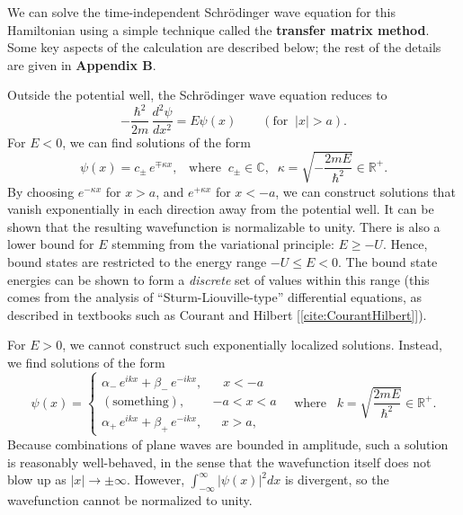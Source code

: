 \documentclass[pra,12pt]{revtex4}
\begin{document}
We can solve the time-independent Schr\"odinger wave equation for this
Hamiltonian using a simple technique called the \textbf{transfer
  matrix method}.  Some key aspects of the calculation are described
below; the rest of the details are given in \textbf{Appendix B}.

Outside the potential well, the Schr\"odinger wave equation reduces to
\begin{equation}
  -\frac{\hbar^2}{2m}\,\frac{d^2\psi}{dx^2} = E \psi(x)
  \qquad (\text{for}\;\;|x| > a).  
  \label{eq:psioutside}
\end{equation}
For $E < 0$, we can find solutions of the form
\begin{equation}
  \psi(x) = c_\pm\, e^{\mp\kappa x},\;\;\;\mathrm{where}\;\;
  c_\pm \in \mathbb{C}, \;\;
  \kappa = \sqrt{-\frac{2mE}{\hbar^2}} \in \mathbb{R}^+.
\end{equation}
By choosing $e^{-\kappa x}$ for $x > a$, and $e^{+\kappa x}$ for $x <
-a$, we can construct solutions that vanish exponentially in each
direction away from the potential well.  It can be shown that the
resulting wavefunction is normalizable to unity.  There is also a
lower bound for $E$ stemming from the variational principle: $E \ge
-U$.  Hence, bound states are restricted to the energy range $-U \le E
< 0$.  The bound state energies can be shown to form a
\textit{discrete} set of values within this range (this comes from the
analysis of ``Sturm-Liouville-type'' differential equations, as
described in textbooks such as Courant and Hilbert
[\ref{cite:CourantHilbert}]).

For $E > 0$, we cannot construct such exponentially localized
solutions.  Instead, we find solutions of the form
\begin{equation}
  \psi(x) = \begin{cases} \alpha_-\, e^{ik x} + \beta_-\, e^{-ik x}, & \;\;\;x < -a\\ (\mathrm{something}) , & -a < x < a\\ \alpha_+\, e^{ik x} + \beta_+\, e^{-ik x} , & \;\;\,x > a,\end{cases}
  \quad\mathrm{where}\;\;\;
  k = \sqrt{\frac{2mE}{\hbar^2}} \in \mathbb{R}^+.
  \label{psiwaves}
\end{equation}
Because combinations of plane waves are bounded in amplitude, such a
solution is reasonably well-behaved, in the sense that the
wavefunction itself does not blow up as $|x| \rightarrow \pm\infty$.
However, $\int_{-\infty}^\infty |\psi(x)|^2 dx$ is divergent, so the
wavefunction cannot be normalized to unity.
\end{document}

